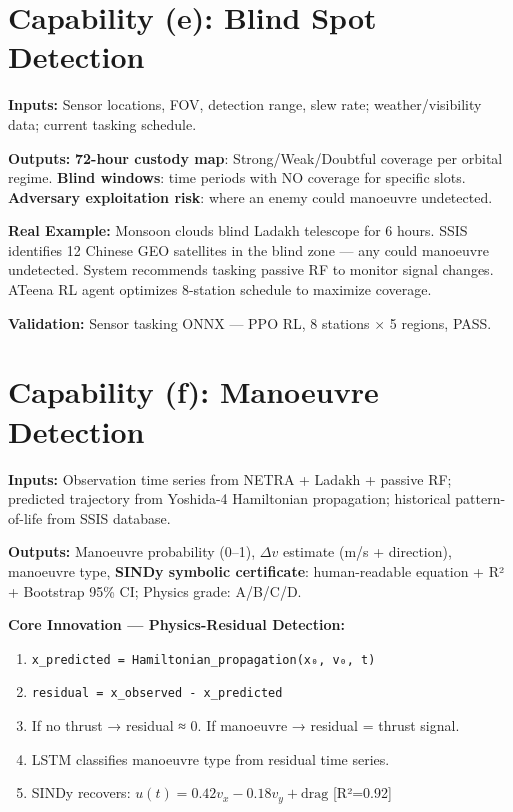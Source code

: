 \documentclass[11pt,a4paper]{article}
\begin{document}
\section{Capability (e): Blind Spot Detection}

\textbf{Inputs:} Sensor locations, FOV, detection range, slew rate; weather/visibility data; current tasking schedule.

\textbf{Outputs:} \textbf{72-hour custody map}: Strong/Weak/Doubtful coverage per orbital regime. \textbf{Blind windows}: time periods with NO coverage for specific slots. \textbf{Adversary exploitation risk}: where an enemy could manoeuvre undetected.

\textbf{Real Example:} Monsoon clouds blind Ladakh telescope for 6 hours. SSIS identifies 12 Chinese GEO satellites in the blind zone --- any could manoeuvre undetected. System recommends tasking passive RF to monitor signal changes. ATeena RL agent optimizes 8-station schedule to maximize coverage.

\textbf{Validation:} Sensor tasking ONNX --- PPO RL, 8 stations $\times$ 5 regions, PASS.

\section{Capability (f): Manoeuvre Detection}

\textbf{Inputs:} Observation time series from NETRA + Ladakh + passive RF; predicted trajectory from Yoshida-4 Hamiltonian propagation; historical pattern-of-life from SSIS database.

\textbf{Outputs:} Manoeuvre probability (0--1), $\Delta v$ estimate (m/s + direction), manoeuvre type, \textbf{SINDy symbolic certificate}: human-readable equation + R² + Bootstrap 95\% CI; Physics grade: A/B/C/D.

\textbf{Core Innovation --- Physics-Residual Detection:}
\begin{enumerate}[noitemsep]
  \item \texttt{x\_predicted = Hamiltonian\_propagation(x₀, v₀, t)}
  \item \texttt{residual = x\_observed - x\_predicted}
  \item If no thrust → residual ≈ 0. If manoeuvre → residual = thrust signal.
  \item LSTM classifies manoeuvre type from residual time series.
  \item SINDy recovers: $u(t)=0.42v_x - 0.18v_y + \text{drag}$ [R²=0.92]
\end{enumerate}
\end{document}
